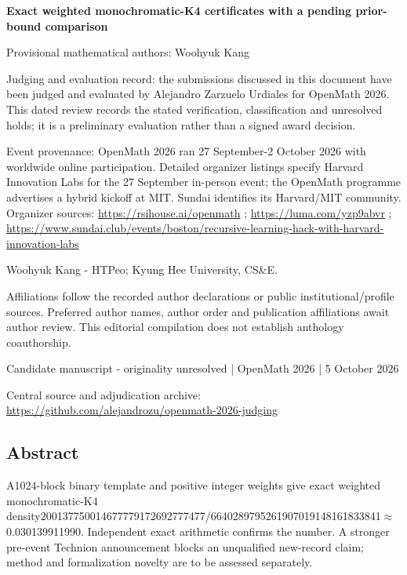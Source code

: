 \documentclass[11pt,a4paper]{article}
\begin{document}
{\LARGE\bfseries Exact weighted monochromatic-K4 certificates with a pending prior-bound comparison\par}\medskip
{\small Provisional mathematical authors: Woohyuk Kang\par}\medskip
{\small Judging and evaluation record: the submissions discussed in this document have been judged and evaluated by Alejandro Zarzuelo Urdiales for OpenMath 2026. This dated review records the stated verification, classification and unresolved holds; it is a preliminary evaluation rather than a signed award decision.\par}

{\small Event provenance: OpenMath 2026 ran 27 September-2 October 2026 with worldwide online participation. Detailed organizer listings specify Harvard Innovation Labs for the 27 September in-person event; the OpenMath programme advertises a hybrid kickoff at MIT. Sundai identifies its Harvard/MIT community. Organizer sources: \url{https://rsihouse.ai/openmath} ; \url{https://luma.com/yzp9abvr} ; \url{https://www.sundai.club/events/boston/recursive-learning-hack-with-harvard-innovation-labs}\par}

{\small Woohyuk Kang  -  HTPeo; Kyung Hee University, CS\&E.\par}

{\small Affiliations follow the recorded author declarations or public institutional/profile sources. Preferred author names, author order and publication affiliations await author review. This editorial compilation does not establish anthology coauthorship.\par}

{\small Candidate manuscript  -  originality unresolved | OpenMath 2026 | 5 October 2026\par}\medskip
{\small Central source and adjudication archive: \url{https://github.com/alejandrozu/openmath-2026-judging}\par}

\subsection{Abstract}
A1024-block binary template and positive integer weights give exact weighted monochromatic-K4 density200137750014677779172692777477/6640289795261907019148161833841\ensuremath{\approx}0.030139911990. Independent exact arithmetic confirms the number. A stronger pre-event Technion announcement blocks an unqualified new-record claim; method and formalization novelty are to be assessed separately.
\end{document}
